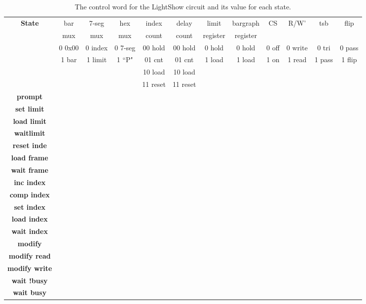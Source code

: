 \documentclass{article}[10 pt,landscape]
\begin{document}
\begin{landscape}
\begin{table}
{\small
\begin{tabular}{c||c|c|c|c|c|c|c|c|c|c|c}
{\bf State } 	& bar & 7-seg & hex & index & delay & limit    & bargraph & CS & R/W' & tsb & flip \\  
	& mux & mux   & mux & count & count & register & register &       &       & &      \\  \hline \hline
	& 0 0x00 & 0 index & 0 7-seg & 00 hold & 00 hold & 0 hold & 0 hold & 0 off & 0 write & 0 tri & 0 pass \\ 
	& 1 bar	& 1 limit & 1 ``P"& 01 cnt & 01 cnt & 1 load &    1 load & 1 on    &  1 read & 1 pass & 1 flip \\
	& 	&     &     & 10 load & 10 load & & & & & \\
	& 	&     &	    & 11 reset	& 11 reset & & & & \\ \hline \hline
{\bf prompt } 	 & 	  &	  &	  &	   &	   &	  &	  &	  &   &	  &   \\ \hline
{\bf set limit }  & 	  &	  &	  &	   &	   &	  &	  &	  &   &	  &   \\ \hline
{\bf load limit } &	  &	  &	  &	   &	   &	  &	  &	  &   &	  &   \\ \hline
{\bf waitlimit } &	  &	  &	  &	   &	   &	  &	  &	  &   &	  &   \\ \hline
{\bf reset inde  } &	  &	  & 	  &	   &	   &	  &	  &	  &   &	  &   \\ \hline
{\bf load frame } &	  &	  &	  &	   &	   &	  &	  &	  &   &   &   \\ \hline
{\bf wait frame } &	  &	  &	  &	   &	   &	  &	  &	  &   &	  &   \\ \hline
{\bf inc index } &	  &	  &	  &	   &	   &	  &	  &	  &   &	  &   \\ \hline
{\bf comp index } &	  &	  &	  &	   &	   &	  &	  &	  &   &	  &   \\ \hline
{\bf set index } &	  &	  &	  &	   & 	   &	  & 	  &	  &   &	  &   \\ \hline
{\bf load index } &	  &	  & 	  &	   &	   &	  &	  &	  &   &   &   \\ \hline
{\bf wait index } &	  &	  &	  &	   &	   &	  &	  &	  &   &	  &   \\ \hline
{\bf modify	} &	  &	  &	  &	   &	   &	  &	  &	  &   &	  &   \\ \hline
{\bf modify read} &	  &	  &	  &	   &	   &	  &	  &	  &   &	  &   \\ \hline
{\bf modify write } &	  &	  &	  &	   &	   &	  &	  & 	  &   &	  &   \\ \hline
{\bf wait !busy } &	  &	  &	  &	   &	   &	  &	  &	  &   &	  &   \\ \hline
{\bf wait busy } &	  &	  &	  &	   &	   &	  &	  &	  &   &	  &   \\ 
\end{tabular} 
}
\caption{The control word for the LightShow circuit and its value for each state.}
\label{table:LightShow}
\end{table}

\end{landscape}
\end{document}
